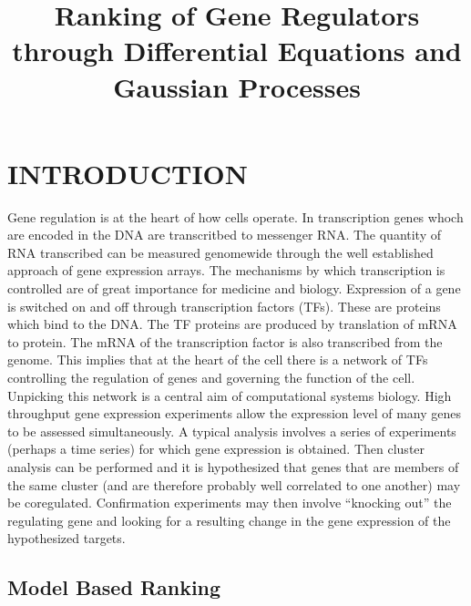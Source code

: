 \documentclass{article}
\title{Ranking of Gene Regulators through Differential Equations and Gaussian Processes}
\begin{document}
\maketitle

\begin{abstract}
\end{abstract}

\section{INTRODUCTION}

Gene regulation is at the heart of how cells operate. In transcription
genes  whoch are  encoded in  the  DNA are  transcritbed to  messenger
RNA.  The  quantity of  RNA  transcribed  can  be measured  genomewide
through the  well established approach of gene  expression arrays. The
mechanisms  by   which  transcription  is  controlled   are  of  great
importance for medicine and biology.  Expression of a gene is switched
on  and off through  transcription factors  (TFs). These  are proteins
which bind to the DNA. The  TF proteins are produced by translation of
mRNA  to  protein.  The  mRNA  of the  transcription  factor  is  also
transcribed from  the genome.  This implies that  at the heart  of the
cell there is a network of TFs controlling the regulation of genes and
governing  the function  of  the  cell. Unpicking  this  network is  a
central  aim of  computational systems  biology. High  throughput gene
expression experiments allow the expression  level of many genes to be
assessed  simultaneously.  A typical  analysis  involves  a series  of
experiments  (perhaps a  time  series) for  which  gene expression  is
obtained.  Then   cluster  analysis  can   be  performed  and   it  is
hypothesized that genes that are  members of the same cluster (and are
therefore   probably  well   correlated   to  one   another)  may   be
coregulated.  Confirmation  experiments  may then  involve  ``knocking
out'' the  regulating gene and looking  for a resulting  change in the
gene expression of the hypothesized targets.

\subsection{Model Based Ranking}
\end{document}
